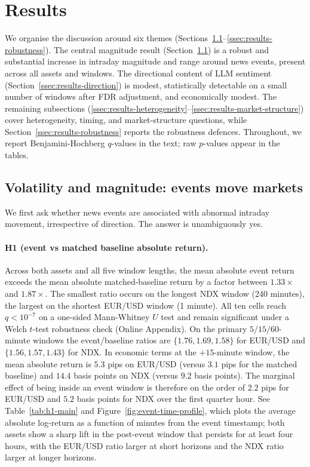 \section{Results}
\label{sec:results}

We organise the discussion around six themes
(Sections~\ref{ssec:results-volatility}--\ref{ssec:results-robustness}).
The central magnitude result (Section~\ref{ssec:results-volatility})
is a robust and substantial increase in intraday magnitude and range
around news events, present across all assets and windows. The
directional content of LLM sentiment (Section~\ref{ssec:results-direction})
is modest, statistically detectable on a small number of windows
after FDR adjustment, and economically modest. The
remaining subsections (\ref{ssec:results-heterogeneity}--\ref{ssec:results-market-structure})
cover heterogeneity, timing, and market-structure questions, while
Section~\ref{ssec:results-robustness} reports the robustness
defences. Throughout, we report Benjamini-Hochberg $q$-values in the
text; raw $p$-values appear in the tables.

\subsection{Volatility and magnitude: events move markets}
\label{ssec:results-volatility}

We first ask whether news events are associated with abnormal
intraday movement, irrespective of direction. The answer is
unambiguously yes.

\paragraph{H1 (event vs matched baseline absolute return).}
Across both assets and all five window lengths, the mean absolute
event return exceeds the mean absolute matched-baseline return by a
factor between $1.33\times$ and $1.87\times$. The smallest ratio
occurs on the longest NDX window (240 minutes), the largest on the
shortest EUR/USD window (1 minute). All ten cells reach $q < 10^{-7}$
on a one-sided Mann-Whitney $U$ test and remain significant under a
Welch $t$-test robustness check (Online Appendix). On the primary
$5/15/60$-minute windows the event/baseline ratios are
$\{1.76, 1.69, 1.58\}$ for EUR/USD and $\{1.56, 1.57, 1.43\}$ for
NDX. In economic terms at the $+15$-minute window, the mean
absolute return is $5.3$ pips on EUR/USD (versus $3.1$ pips for the
matched baseline) and $14.4$ basis points on NDX (versus $9.2$
basis points). The marginal effect of being inside an event window
is therefore on the order of $2.2$ pips for EUR/USD and $5.2$ basis
points for NDX over the first quarter hour. See
Table~\ref{tab:h1-main} and Figure~\ref{fig:event-time-profile},
which plots the average absolute log-return as a function of
minutes from the event timestamp; both assets show a sharp lift in
the post-event window that persists for at least four hours, with
the EUR/USD ratio larger at short horizons and the NDX ratio larger
at longer horizons.

